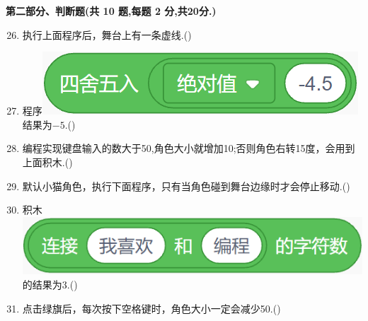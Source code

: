 \documentclass[10pt, a4paper]{article}
\begin{document}
    {\noindent\textbf{第二部分、判断题(共 10 题,每题 2 分,共20分.)}}
    \begin{enumerate}
        \setcounter{enumi}{25}
        \item 执行上面程序后，舞台上有一条虚线.(\qquad)

        \item 程序\includegraphics[width=.18\textwidth]{27.png}结果为$-5$.(\qquad)

        \item 编程实现键盘输入的数大于50,角色大小就增加10;否则角色右转15度，会用到上面积木.(\qquad)
  
        \item 默认小猫角色，执行下面程序，只有当角色碰到舞台边缘时才会停止移动.(\qquad)
        
        \item 积木\includegraphics[width=.2\textwidth]{30.png}的结果为3.(\qquad)
        
        \item 点击绿旗后，每次按下空格键时，角色大小一定会减少50.(\qquad)
        

\end{enumerate}
\end{document}
